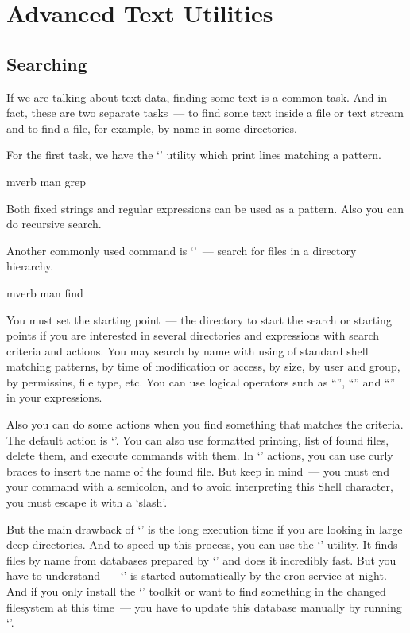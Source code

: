 \section*{Advanced Text Utilities}

\subsection*{Searching} %

If we are talking about text data, finding some text is a common task.
And in fact, these are two separate tasks~--- to find some text inside a file
or text stream and to find a file, for example, by name in some directories.

For the first task, we have the `' utility which print lines matching
a pattern.
\begin{code}{mverb}
man grep
\end{code}
Both fixed strings and regular expressions can be used as a pattern.
Also you can do recursive search.

Another commonly used command is `'~--- search for files
in a directory hierarchy.
\begin{code}{mverb}
man find
\end{code}

You must set the starting point~--- the directory to start the search or
starting points if you are interested in several directories and expressions
with search criteria and actions. You may search by name with using of standard
shell matching patterns, by time of modification or access, by size, by user
and group, by permissins, file type, etc. You can use logical operators such
as ``'', ``'' and ``'' in your expressions.

Also you can do some actions when you find something that matches the criteria.
The default action is `'. You can also use formatted printing,
list of found files, delete them, and execute commands with them.
In `' actions, you can use curly braces to insert the name of
the found file. But keep in mind~--- you must end your command with a semicolon,
and to avoid interpreting this Shell character, you must escape it
with a `slash'.

But the main drawback of `' is the long execution time if you are
looking in large deep directories. And to speed up this process, you can use
the `' utility. It finds files by name from databases prepared
by `' and does it incredibly fast. But you have to understand~---
`' is started automatically by the cron service at night.
And if you only install the `' toolkit or want to find something
in the changed filesystem at this time~--- you have to update this database
manually by running `'.

